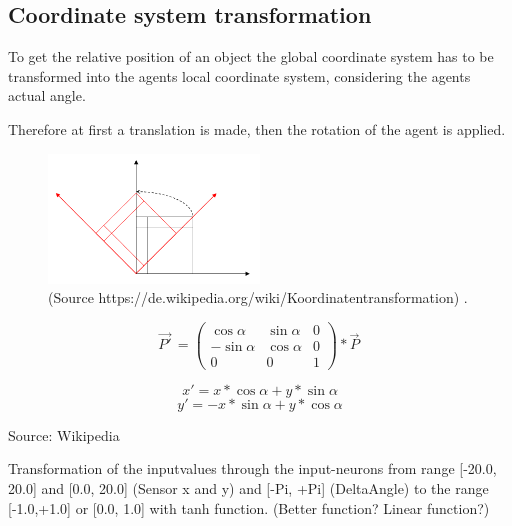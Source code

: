 \documentclass[10pt,a4paper,DIV=11]{scrreprt}
\begin{document}
\subsection{Coordinate system transformation}

To get the relative position of an object the global coordinate system has to be transformed into the agents local coordinate system, considering the agents actual angle.

Therefore at first a translation is made, then the rotation of the agent is applied.

\begin{center}
	\begin{figure}[H]
		\centering
		\includegraphics[width=0.5\textwidth,scale=1.0]{files/CoordinateRotation.png}  
		\caption{(Source https://de.wikipedia.org/wiki/Koordinatentransformation) \cite{wikipedia}.}
		\label{fig:cosys-transform}
	\end{figure}
\end{center}

\begin{equation}
\vec{P'}^{\,} =
\begin{pmatrix}
\cos \alpha & \sin \alpha & 0 \\
-\sin \alpha & \cos \alpha & 0 \\
0 & 0 & 1
\end{pmatrix}
* \vec{P}^{\,}
\end{equation}

\begin{equation}
x' = x * \cos \alpha + y * \sin \alpha
\end{equation}
\begin{equation}
y' = -x * \sin \alpha + y * \cos \alpha
\end{equation}

Source: Wikipedia


Transformation of the inputvalues through the input-neurons from range [-20.0, 20.0] and [0.0, 20.0] (Sensor x and y) and [-Pi, +Pi] (DeltaAngle) to the range [-1.0,+1.0] or [0.0, 1.0] with tanh function. (Better function? Linear function?)
\end{document}
